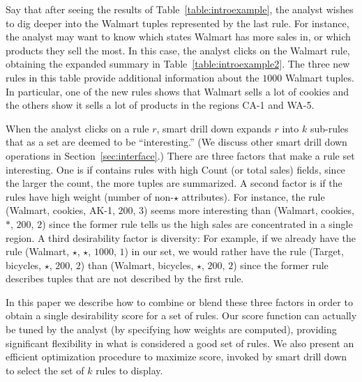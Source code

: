 \begin{example}
Say that after seeing the results of Table~\ref{table:introexample},
the analyst wishes to dig deeper into the Walmart tuples
represented by the last rule.
For instance, the analyst may want to know
which states Walmart has more sales in, or which products they sell
the most. In this case, the analyst clicks on the Walmart rule,
obtaining the expanded summary in Table~\ref{table:introexample2}.
The three new rules in this table provide additional information
about the $1000$ Walmart tuples.
In particular, one of the new rules shows that
Walmart sells a lot of cookies and the others show it sells a lot of products in
the regions CA-1 and WA-5.

When the analyst clicks on a rule $r$, smart drill down
expands $r$ into $k$ sub-rules that as a set are deemed to be ``interesting.''
(We discuss other smart drill down operations in Section~\ref{sec:interface}.)
There are three factors that make a rule set interesting.
One is if contains rules with high Count (or total sales) fields,
since the larger the count, the more tuples are summarized.
A second factor is if the rules have high weight (number of non-$\star$ attributes).
For instance, the rule (Walmart, cookies, AK-1, $200$, $3$)
seems more interesting than (Walmart, cookies, $*$, $200$, $2$)
since the former rule tells us the high sales are concentrated in a single region.
A third desirability factor is diversity:
For example, if we already have the rule (Walmart, $\star$, $\star$, $1000$, $1$)
in our set, we would rather have the rule (Target, bicycles, $\star$, $200$, $2$)
than (Walmart, bicycles, $\star$, $200$, $2$) since the former rule
describes tuples that are not described by the first rule.

In this paper we describe how to combine or blend these three factors
in order to obtain a single desirability score for a set of rules.
Our score function can actually be tuned by the analyst
(by specifying how weights are computed),
providing significant flexibility in what is considered a good set of rules.
We also present an efficient optimization procedure to maximize score, invoked
by smart drill down to select the set of $k$ rules to display.

\end{example}

